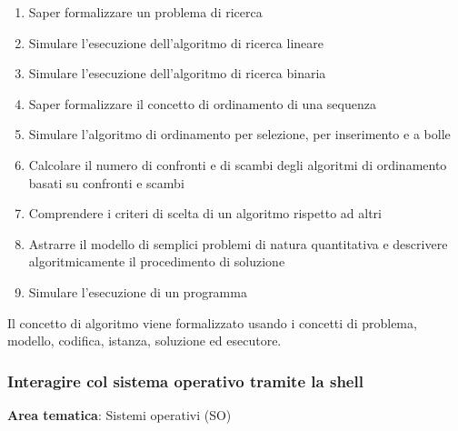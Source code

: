 \begin{enumerate}
  \item Saper formalizzare un problema di ricerca
  \item Simulare l'esecuzione dell'algoritmo di ricerca lineare
  \item Simulare l'esecuzione dell'algoritmo di ricerca binaria
  \item Saper formalizzare il concetto di ordinamento di una sequenza
  \item Simulare l'algoritmo di ordinamento per selezione, per inserimento e a bolle
  \item Calcolare il numero di confronti e di scambi degli algoritmi di ordinamento basati su confronti e scambi
  \item Comprendere i criteri di scelta di un algoritmo rispetto ad altri
  \item Astrarre il modello di semplici problemi di natura quantitativa e descrivere algoritmicamente il procedimento di soluzione
  \item Simulare l'esecuzione di un programma
\end{enumerate}

Il concetto di algoritmo viene formalizzato usando i concetti di problema, modello, codifica, istanza, soluzione ed esecutore.

\subsubsection[Sistemi Operativi]{Interagire col sistema operativo tramite la shell}
\label{sec:sistemi-operativi}

\noindent\textbf{Area tematica}: Sistemi operativi (SO)

